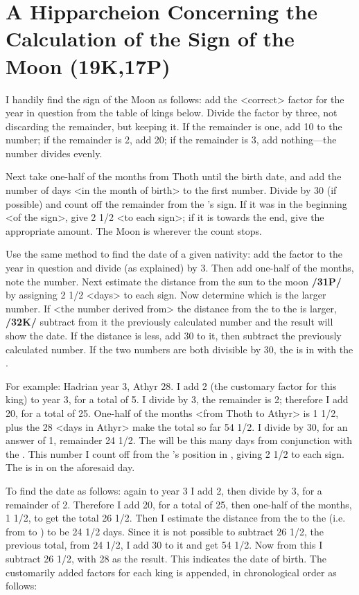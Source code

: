 \section{A Hipparcheion Concerning the Calculation of the Sign of the Moon (19K,17P)}
I handily find the sign of the Moon as follows: add the <correct> factor for the year in question from the table of kings below. Divide the factor by three, not discarding the remainder, but keeping it. If the remainder is one, add 10 to the number; if the remainder is 2, add 20; if the remainder is 3, add nothing—the number divides evenly. 

Next take one-half of the months from Thoth until the birth date, and add the number of days <in the month of birth> to the first number. Divide by 30 (if possible) and count off the remainder from the \Sun’s sign. If it was in the beginning <of the sign>, give 2 1/2 <to each sign>; if it is towards the end, give the appropriate amount. The Moon is wherever the count stops.

Use the same method to find the date of a given nativity: add the factor to the year in question and divide (as explained) by 3. Then add one-half of the months, note the number. Next estimate the distance from the sun to the moon \textbf{/31P/} by assigning 2 1/2 <days> to each sign. Now determine which is the larger number. If <the number derived from> the distance from the \Sun\xspace to the \Moon\xspace is larger, \textbf{/32K/} subtract from it the previously calculated number and the result will show the date. If the distance is less, add 30 to it, then subtract the previously calculated number. If the two numbers are both divisible by 30, the \Moon\xspace is in \Conjunction with the \Sun.

For example: Hadrian year 3, Athyr 28. I add 2 (the customary factor for this king) to year 3, for a total of 5. I divide by 3, the remainder is 2; therefore I add 20, for a total of 25. One-half of the months <from Thoth to Athyr> is 1 1/2, plus the 28 <days in Athyr> make the total so far 54 1/2. I divide by 30, for an answer of 1, remainder 24 1/2. The \Moon\xspace will be this many days from conjunction with the \Sun. This number I count off from the \Sun’s position in \Sagittarius, giving 2 1/2 to each sign. The \Moon\xspace is in \Virgo\xspace on the aforesaid day.

To find the date as follows: again to year 3 I add 2, then divide by 3, for a remainder of 2. Therefore I add 20, for a total of 25, then one-half of the months, 1 1/2, to get the total 26 1/2. Then I estimate the distance from the \Sun\xspace to the \Moon\xspace (i.e. from \Sagittarius\xspace to \Virgo) to be 24 1/2 days. Since it is not possible to subtract 26 1/2, the previous total, from 24 1/2, I add 30 to it and get 54 1/2. Now from this I subtract 26 1/2, with 28 as the result. This indicates the date of birth. The customarily added factors for each king is appended, in chronological order as follows:

